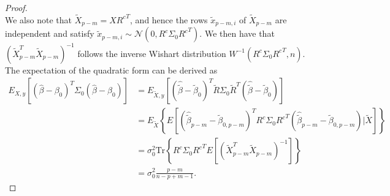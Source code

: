 \begin{proof}
\begin{equation*}
\end{equation*}
We also note that $\tilde{X}_{p-m} = X {R^c}^T$, and hence the rows $\tilde{x}_{p-m, i}$ of $\tilde{X}_{p-m}$ are independent and satisfy $\tilde{x}_{p-m, i} \sim \mathcal{N} \left( 0, R^c \Sigma_0 {R^c}^T \right)$. We then have that $\left( \tilde{X}_{p-m}^T \tilde{X}_{p-m} \right)^{-1}$ follows the inverse Wishart distribution $W^{-1}( R^c \Sigma_0 {R^c}^T, n)$. The expectation of the quadratic form can be derived as
\begin{equation*}
\begin{aligned}
E_{X,y}  \left [ (\hat \beta-\beta_0)^T \Sigma_0 (\hat \beta-\beta_0) \right ] 
&=  E_{\tilde{X},y}  \left [ \left( \hat{\tilde{\beta}} - \tilde{\beta}_0 \right)^T \tilde{R} \Sigma_0 \tilde{R}^T \left( \hat{\tilde{\beta}} - \tilde{\beta}_0 \right) \right ]\\
&=  E_{\tilde{X}} \left\{ E  \left [ \left( \hat{\tilde{\beta}}_{p-m} - \tilde{\beta}_{0,p-m} \right)^T R^c \Sigma_0 {R^c}^T \left(\hat{\tilde{\beta}}_{p-m} - \tilde{\beta}_{0,p-m} \right) \Big| \tilde{X} \right ]  \right\}\\
&= \sigma_0^2 \text{Tr} \left\{ R^c \Sigma_0 {R^c}^T E \left[ \left( \tilde{X}_{p-m}^T \tilde{X}_{p-m} \right)^{-1} \right] \right\} \\
&= \sigma_0^2 \frac{p-m}{n-p+m-1}.
\end{aligned}
\end{equation*}

\end{proof}


